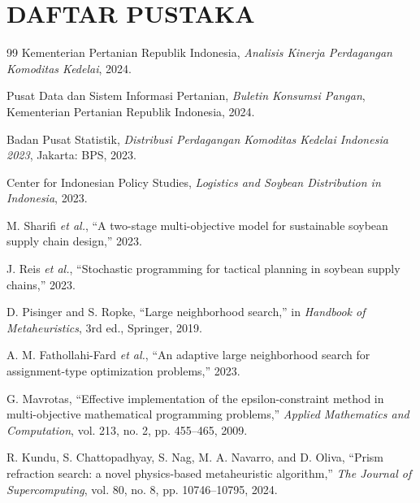 \documentclass[journal]{IEEEtran}
\theoremstyle{definition}
\theoremstyle{definition}
\theoremstyle{plain}
\begin{document}
    \section*{DAFTAR PUSTAKA}
    \begin{thebibliography}{99}
    Kementerian Pertanian Republik Indonesia, \textit{Analisis Kinerja Perdagangan Komoditas Kedelai}, 2024.

    Pusat Data dan Sistem Informasi Pertanian, \textit{Buletin Konsumsi Pangan}, Kementerian Pertanian Republik Indonesia, 2024.

    Badan Pusat Statistik, \textit{Distribusi Perdagangan Komoditas Kedelai Indonesia 2023}, Jakarta: BPS, 2023.

    Center for Indonesian Policy Studies, \textit{Logistics and Soybean Distribution in Indonesia}, 2023.

    M. Sharifi \textit{et al.}, ``A two-stage multi-objective model for sustainable soybean supply chain design,'' 2023.

    J. Reis \textit{et al.}, ``Stochastic programming for tactical planning in soybean supply chains,'' 2023.

    D. Pisinger and S. Ropke, ``Large neighborhood search,'' in \textit{Handbook of Metaheuristics}, 3rd ed., Springer, 2019.

    A. M. Fathollahi-Fard \textit{et al.}, ``An adaptive large neighborhood search for assignment-type optimization problems,'' 2023.

    G. Mavrotas, ``Effective implementation of the epsilon-constraint method in multi-objective mathematical programming problems,'' \textit{Applied Mathematics and Computation}, vol. 213, no. 2, pp. 455--465, 2009.

    R. Kundu, S. Chattopadhyay, S. Nag, M. A. Navarro, and D. Oliva, ``Prism refraction search: a novel physics-based metaheuristic algorithm,'' \textit{The Journal of Supercomputing}, vol. 80, no. 8, pp. 10746--10795, 2024.
    \end{thebibliography}
\end{document}
